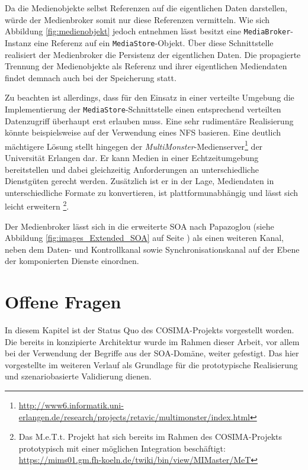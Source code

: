  Da die Medienobjekte selbst Referenzen auf die eigentlichen Daten darstellen, würde der Medienbroker somit nur diese Referenzen vermitteln. Wie sich Abbildung \ref{fig:medienobjekt} jedoch entnehmen lässt besitzt eine \verb!MediaBroker!-Instanz eine Referenz auf ein \verb!MediaStore!-Objekt. Über diese Schnittstelle realisiert der Medienbroker die Persistenz der eigentlichen Daten. Die propagierte Trennung der Medienobjekte als Referenz und ihrer eigentlichen Mediendaten findet demnach auch bei der Speicherung statt.
  
  Zu beachten ist allerdings, dass für den Einsatz in einer verteilte Umgebung die Implementierung der \verb!MediaStore!-Schnittstelle einen entsprechend verteilten Datenzugriff überhaupt erst erlauben muss. Eine sehr rudimentäre Realisierung könnte beispielsweise auf der Verwendung eines NFS basieren. Eine deutlich mächtigere Lösung stellt hingegen der \emph{MultiMonster}-Medienserver\footnote{\url{http://www6.informatik.uni-erlangen.de/research/projects/retavic/multimonster/index.html}} der Universität Erlangen dar. Er kann Medien in einer Echtzeitumgebung bereitstellen und dabei gleichzeitig Anforderungen an unterschiedliche Dienstgüten gerecht werden. Zusätzlich ist er in der Lage, Mediendaten in unterschiedliche Formate zu konvertieren, ist plattformunabhängig und lässt sich leicht erweitern \citep{suchomski2004oar}\footnote{Das M.e.T.t. Projekt hat sich bereits im Rahmen des COSIMA-Projekts prototypisch mit einer möglichen Integration beschäftigt: \url{https://mims01.gm.fh-koeln.de/twiki/bin/view/MIMaster/MeT}}.
  
  Der Medienbroker lässt sich in die erweiterte SOA nach Papazoglou (siehe Abbildung \ref{fig:images_Extended_SOA} auf Seite \pageref{fig:images_Extended_SOA}) als einen weiteren Kanal, neben dem Daten- und Kontrollkanal sowie Synchronisationskanal auf der Ebene der komponierten Dienste einordnen.
  



\section{Offene Fragen} %
\label{sec:offene_fragen}

  In diesem Kapitel ist der Status Quo des COSIMA-Projekts vorgestellt worden. Die bereits in \citep{bericht} konzipierte Architektur wurde im Rahmen dieser Arbeit, vor allem bei der Verwendung der Begriffe aus der SOA-Domäne, weiter gefestigt. Das hier vorgestellte im weiteren Verlauf als Grundlage für die prototypische Realisierung und szenariobasierte Validierung dienen.

